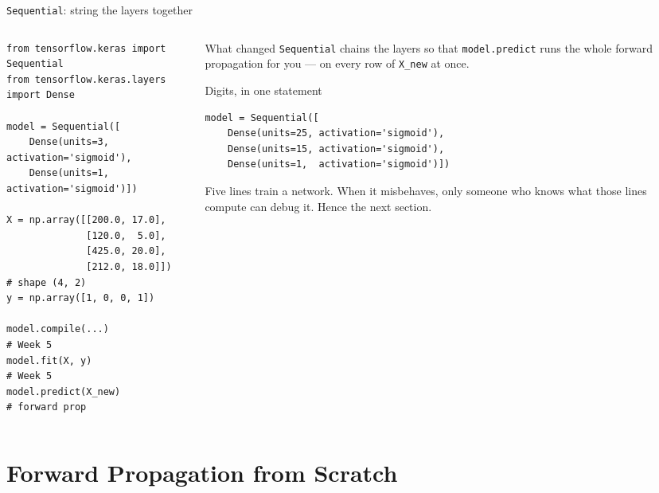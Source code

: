 \documentclass[aspectratio=169,10pt]{beamer}
\begin{document}
\begin{frame}[fragile]{\texttt{Sequential}: string the layers together}
  \begin{columns}[T,onlytextwidth]
    \begin{column}{0.52\textwidth}
\begin{lstlisting}
from tensorflow.keras import Sequential
from tensorflow.keras.layers import Dense

model = Sequential([
    Dense(units=3, activation='sigmoid'),
    Dense(units=1, activation='sigmoid')])

X = np.array([[200.0, 17.0],
              [120.0,  5.0],
              [425.0, 20.0],
              [212.0, 18.0]])    # shape (4, 2)
y = np.array([1, 0, 0, 1])

model.compile(...)               # Week 5
model.fit(X, y)                  # Week 5
model.predict(X_new)             # forward prop
\end{lstlisting}
    \end{column}
    \begin{column}{0.44\textwidth}
      \footnotesize
      \begin{block}{What changed}
        \texttt{Sequential} chains the layers so that \texttt{model.predict} runs the whole
        forward propagation for you --- on every row of \texttt{X\_new} at once.
      \end{block}
      \begin{block}{Digits, in one statement}
\begin{lstlisting}
model = Sequential([
    Dense(units=25, activation='sigmoid'),
    Dense(units=15, activation='sigmoid'),
    Dense(units=1,  activation='sigmoid')])
\end{lstlisting}
      \end{block}
      \begin{pitfall}
        \footnotesize Five lines train a network. When it misbehaves, only someone who knows
        what those lines compute can debug it. Hence the next section.
      \end{pitfall}
    \end{column}
  \end{columns}
\end{frame}

\section{Forward Propagation from Scratch}
\end{document}
